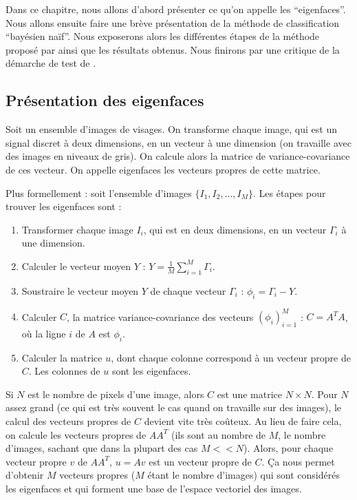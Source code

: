 Dans ce chapitre, nous allons d'abord présenter ce qu'on appelle les ``eigenfaces''.
Nous allons ensuite faire une brève présentation de la méthode de classification
``bayésien naïf''. Nous exposerons alors les différentes étapes de la méthode proposé
par \cite{article} ainsi que les résultats obtenus. Nous finirons par une critique de
la démarche de test de \cite{article}.


\subsection{Présentation des eigenfaces} \label{subsection:presentation_eigenfaces}
Soit un ensemble d'images de visages. On transforme chaque image, qui est un signal
discret à deux dimensions, en un vecteur à une dimension (on travaille avec des
images en niveaux de gris). On calcule alors la matrice de variance-covariance
de ces vecteur. On appelle eigenfaces les vecteurs propres de cette matrice.

Plus formellement : soit l'ensemble d'images $\{I_1, I_2, ..., I_M\}$.
Les étapes pour trouver les eigenfaces sont :
\begin{enumerate}
    \item Transformer chaque image $I_i$, qui est en deux dimensions,
    en un vecteur $\Gamma_i$ à une dimension.
    \item Calculer le vecteur moyen $Y$ : $Y = \frac{1}{M} \sum_{i=1}^M \Gamma_i$.
    \item Soustraire le vecteur moyen $Y$ de chaque vecteur $\Gamma_i$ : $\phi_i = \Gamma_i - Y$.
    \item Calculer $C$, la matrice variance-covariance des vecteurs $(\phi_i)_{i=1}^M$ :
    $C = A^TA$, où la ligne $i$ de $A$ est $\phi_i$.
    \item Calculer la matrice $u$, dont chaque colonne correspond à un vecteur
    propre de $C$. Les colonnes de $u$ sont les eigenfaces.
\end{enumerate}
Si $N$ est le nombre de pixels d'une image, alors $C$ est une matrice $N \times N$.
Pour $N$ assez grand (ce qui est très souvent le cas quand on travaille sur des images),
le calcul des vecteurs propres de $C$ devient vite très coûteux. Au lieu de faire cela,
on calcule les vecteurs propres de $AA^T$ (ils sont au nombre de $M$, le nombre d'images,
sachant que dans la plupart des cas $M << N$). Alors, pour chaque vecteur propre $v$ de
$AA^T$, $u = Av$ est un vecteur propre de $C$. Ça nous permet d'obtenir $M$ vecteurs
propres ($M$ étant le nombre d'images) qui sont considérés les eigenfaces et qui forment
une base de l'espace vectoriel des images.


